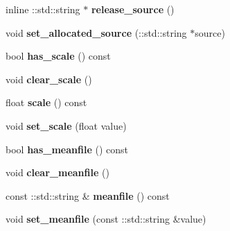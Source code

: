 \begin{DoxyCompactItemize}
\item 
\mbox{\label{classcaffe_1_1_v0_layer_parameter_a7c4acd16832ca271dfd09bf08d37d2a3}} 
inline \+::std\+::string $\ast$ {\bfseries release\+\_\+source} ()
\item 
\mbox{\label{classcaffe_1_1_v0_layer_parameter_a19a560c448a09cf579973e2e2a9a61bd}} 
void {\bfseries set\+\_\+allocated\+\_\+source} (\+::std\+::string $\ast$source)
\item 
\mbox{\label{classcaffe_1_1_v0_layer_parameter_a563aff74e01497f7ebbeab86b66cceb5}} 
bool {\bfseries has\+\_\+scale} () const
\item 
\mbox{\label{classcaffe_1_1_v0_layer_parameter_a8f0c6089d61a100fcec6364a2f9d06ef}} 
void {\bfseries clear\+\_\+scale} ()
\item 
\mbox{\label{classcaffe_1_1_v0_layer_parameter_adddb90d621352011968ba96530d176ef}} 
float {\bfseries scale} () const
\item 
\mbox{\label{classcaffe_1_1_v0_layer_parameter_ac4cde99767802197662ab260dfa8cf44}} 
void {\bfseries set\+\_\+scale} (float value)
\item 
\mbox{\label{classcaffe_1_1_v0_layer_parameter_a9aea3c0076381883cc507dd77a5b1f43}} 
bool {\bfseries has\+\_\+meanfile} () const
\item 
\mbox{\label{classcaffe_1_1_v0_layer_parameter_a917a53ca287f2a405d18812d2ec82ca0}} 
void {\bfseries clear\+\_\+meanfile} ()
\item 
\mbox{\label{classcaffe_1_1_v0_layer_parameter_a8ee747e0d55e4f934447d62d456ec339}} 
const \+::std\+::string \& {\bfseries meanfile} () const
\item 
\mbox{\label{classcaffe_1_1_v0_layer_parameter_ae159391ba1c67db1c5f9668a109fad48}} 
void {\bfseries set\+\_\+meanfile} (const \+::std\+::string \&value)

\end{DoxyCompactItemize}
